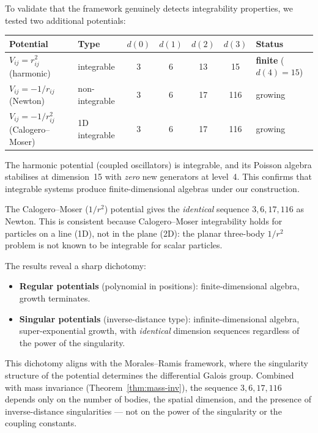 \documentclass[11pt,a4paper]{article}
\theoremstyle{remark}
\begin{document}
To validate that the framework genuinely detects integrability
properties, we tested two additional potentials:

\begin{center}
\begin{tabular}{@{}llccccl@{}}
\toprule
Potential & Type & $d(0)$ & $d(1)$ & $d(2)$ & $d(3)$ & Status \\
\midrule
$V_{ij} = r_{ij}^2$ (harmonic) & integrable & 3 & 6 & 13 & 15 & \textbf{finite} ($d(4)=15$) \\
$V_{ij} = -1/r_{ij}$ (Newton) & non-integrable & 3 & 6 & 17 & 116 & growing \\
$V_{ij} = -1/r_{ij}^2$ (Calogero--Moser) & 1D integrable & 3 & 6 & 17 & 116 & growing \\
\bottomrule
\end{tabular}
\end{center}

The harmonic potential (coupled oscillators) is integrable, and
its Poisson algebra stabilises at dimension~15 with \emph{zero}
new generators at level~4.  This confirms that integrable systems
produce finite-dimensional algebras under our construction.

The Calogero--Moser ($1/r^2$) potential gives the \emph{identical}
sequence $3, 6, 17, 116$ as Newton.  This is consistent because
Calogero--Moser integrability holds for particles on a line (1D),
not in the plane (2D): the planar three-body $1/r^2$ problem is
not known to be integrable for scalar particles.

The results reveal a sharp dichotomy:
\begin{itemize}[nosep]
  \item \textbf{Regular potentials} (polynomial in positions):
    finite-dimensional algebra, growth terminates.
  \item \textbf{Singular potentials} (inverse-distance type):
    infinite-dimensional algebra, super-exponential growth,
    with \emph{identical} dimension sequences regardless of the
    power of the singularity.
\end{itemize}

This dichotomy aligns with the Morales--Ramis framework, where
the singularity structure of the potential determines the
differential Galois group.  Combined with mass invariance
(Theorem~\ref{thm:mass-inv}), the sequence $3, 6, 17, 116$
depends only on the number of bodies, the spatial dimension,
and the presence of inverse-distance singularities --- not on
the power of the singularity or the coupling constants.
\end{document}
